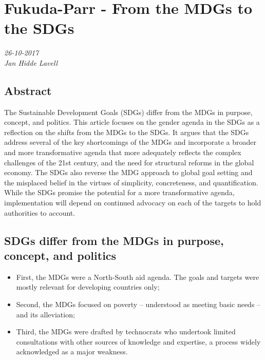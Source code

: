 \chapter{Fukuda-Parr - From the MDGs to the SDGs}
\textit{26-10-2017 \\
Jan Hidde Lavell} 

\section*{Abstract}
The Sustainable Development Goals (SDGs) differ from the MDGs in
purpose, concept, and politics. This article focuses on the gender agenda in the SDGs as a reflection on the shifts from the MDGs to the SDGs. It argues that the SDGs address several of the key shortcomings of the MDGs and incorporate a broader and more transformative agenda that more adequately reflects the complex challenges of the 21st century, and the need for structural reforms in the global economy. The SDGs also reverse the MDG approach to global goal setting and the misplaced belief in the virtues of simplicity, concreteness, and quantification. While the SDGs promise the potential for a more transformative agenda, implementation will depend on continued advocacy on each of the targets to hold authorities to account.

\section*{SDGs differ from the MDGs in purpose, concept, and politics}
\begin{itemize}
\item First, the MDGs were a North-South aid agenda. The goals and targets were mostly relevant for developing countries only;
\item Second, the MDGs focused on poverty – understood as meeting basic needs – and its alleviation;
\item Third, the MDGs were drafted by technocrats who undertook limited consultations with other sources of knowledge and expertise, a process widely acknowledged as a major weakness.
\end{itemize}

